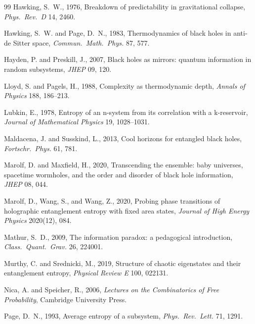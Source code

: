 \documentclass[11pt,letterpaper]{article}
\theoremstyle{plain}
\theoremstyle{definition}
\theoremstyle{remark}
\begin{document}
\begin{thebibliography}{99}
Hawking, S.~W., 1976, Breakdown of predictability in gravitational collapse, \textit{Phys.\ Rev.\ D} 14, 2460.

Hawking, S.~W. and Page, D.~N., 1983, Thermodynamics of black holes in anti-de Sitter space, \textit{Commun.\ Math.\ Phys.} 87, 577.

Hayden, P. and Preskill, J., 2007, Black holes as mirrors: quantum information in random subsystems, \textit{JHEP} 09, 120.

Lloyd, S. and Pagels, H., 1988, Complexity as thermodynamic depth, \textit{Annals of Physics} 188, 186--213.

Lubkin, E., 1978, Entropy of an n-system from its correlation with a k-reservoir, \textit{Journal of Mathematical Physics} 19, 1028--1031.

Maldacena, J. and Susskind, L., 2013, Cool horizons for entangled black holes, \textit{Fortschr.\ Phys.} 61, 781.

Marolf, D. and Maxfield, H., 2020, Transcending the ensemble: baby universes, spacetime wormholes, and the order and disorder of black hole information, \textit{JHEP} 08, 044.

Marolf, D., Wang, S., and Wang, Z., 2020, Probing phase transitions of holographic entanglement entropy with fixed area states, \textit{Journal of High Energy Physics} 2020(12), 084.

Mathur, S.~D., 2009, The information paradox: a pedagogical introduction, \textit{Class.\ Quant.\ Grav.} 26, 224001.

Murthy, C. and Srednicki, M., 2019, Structure of chaotic eigenstates and their entanglement entropy, \textit{Physical Review E} 100, 022131.

Nica, A. and Speicher, R., 2006, \textit{Lectures on the Combinatorics of Free Probability}, Cambridge University Press.

Page, D.~N., 1993, Average entropy of a subsystem, \textit{Phys.\ Rev.\ Lett.} 71, 1291.


\end{thebibliography}
\end{document}
